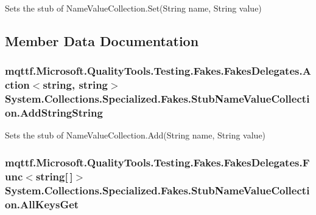 Sets the stub of Name\-Value\-Collection.\-Set(\-String name, String value)



\subsection{Member Data Documentation}
\hypertarget{class_system_1_1_collections_1_1_specialized_1_1_fakes_1_1_stub_name_value_collection_a2e1e89696036fa68d23f473c2124a9c6}{
\subsubsection[{Add\-String\-String}]{\setlength{\rightskip}{0pt plus 5cm}mqttf.\-Microsoft.\-Quality\-Tools.\-Testing.\-Fakes.\-Fakes\-Delegates.\-Action$<$string, string$>$ System.\-Collections.\-Specialized.\-Fakes.\-Stub\-Name\-Value\-Collection.\-Add\-String\-String}}\label{class_system_1_1_collections_1_1_specialized_1_1_fakes_1_1_stub_name_value_collection_a2e1e89696036fa68d23f473c2124a9c6}


Sets the stub of Name\-Value\-Collection.\-Add(\-String name, String value)

\hypertarget{class_system_1_1_collections_1_1_specialized_1_1_fakes_1_1_stub_name_value_collection_a6101d0d0b8adb9337ae40bf4080f8b03}{
\subsubsection[{All\-Keys\-Get}]{\setlength{\rightskip}{0pt plus 5cm}mqttf.\-Microsoft.\-Quality\-Tools.\-Testing.\-Fakes.\-Fakes\-Delegates.\-Func$<$string\mbox{[}$\,$\mbox{]}$>$ System.\-Collections.\-Specialized.\-Fakes.\-Stub\-Name\-Value\-Collection.\-All\-Keys\-Get}}\label{class_system_1_1_collections_1_1_specialized_1_1_fakes_1_1_stub_name_value_collection_a6101d0d0b8adb9337ae40bf4080f8b03}


